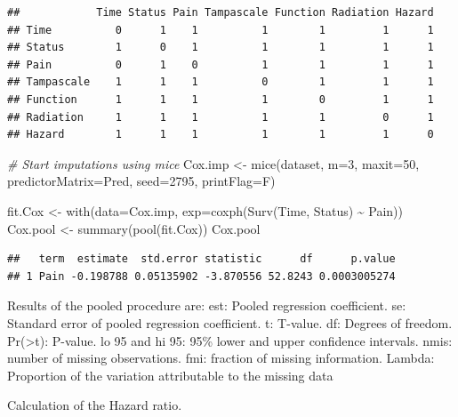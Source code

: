 \documentclass[
]{book}
\newenvironment{Shaded}{\begin{snugshade}}{\end{snugshade}}
\newcommand{\AttributeTok}[1]{\textcolor[rgb]{0.77,0.63,0.00}{#1}}
\newcommand{\CommentTok}[1]{\textcolor[rgb]{0.56,0.35,0.01}{\textit{#1}}}
\newcommand{\DecValTok}[1]{\textcolor[rgb]{0.00,0.00,0.81}{#1}}
\newcommand{\FunctionTok}[1]{\textcolor[rgb]{0.00,0.00,0.00}{#1}}
\newcommand{\NormalTok}[1]{#1}
\newcommand{\OtherTok}[1]{\textcolor[rgb]{0.56,0.35,0.01}{#1}}
\newcommand{\SpecialCharTok}[1]{\textcolor[rgb]{0.00,0.00,0.00}{#1}}
\begin{document}
\begin{verbatim}
##            Time Status Pain Tampascale Function Radiation Hazard
## Time          0      1    1          1        1         1      1
## Status        1      0    1          1        1         1      1
## Pain          0      1    0          1        1         1      1
## Tampascale    1      1    1          0        1         1      1
## Function      1      1    1          1        0         1      1
## Radiation     1      1    1          1        1         0      1
## Hazard        1      1    1          1        1         1      0
\end{verbatim}

\begin{Shaded}
\begin{Highlighting}[]
\CommentTok{\# Start imputations using mice}
\NormalTok{Cox.imp }\OtherTok{\textless{}{-}} \FunctionTok{mice}\NormalTok{(dataset, }\AttributeTok{m=}\DecValTok{3}\NormalTok{, }\AttributeTok{maxit=}\DecValTok{50}\NormalTok{, }\AttributeTok{predictorMatrix=}\NormalTok{Pred, }\AttributeTok{seed=}\DecValTok{2795}\NormalTok{, }\AttributeTok{printFlag=}\NormalTok{F)}

\NormalTok{fit.Cox }\OtherTok{\textless{}{-}} \FunctionTok{with}\NormalTok{(}\AttributeTok{data=}\NormalTok{Cox.imp, }\AttributeTok{exp=}\FunctionTok{coxph}\NormalTok{(}\FunctionTok{Surv}\NormalTok{(Time, Status) }\SpecialCharTok{\textasciitilde{}}\NormalTok{ Pain))}
\NormalTok{Cox.pool }\OtherTok{\textless{}{-}} \FunctionTok{summary}\NormalTok{(}\FunctionTok{pool}\NormalTok{(fit.Cox))}
\NormalTok{Cox.pool}
\end{Highlighting}
\end{Shaded}

\begin{verbatim}
##   term  estimate  std.error statistic      df      p.value
## 1 Pain -0.198788 0.05135902 -3.870556 52.8243 0.0003005274
\end{verbatim}

Results of the pooled procedure are:
est: Pooled regression coefficient.
se: Standard error of pooled regression coefficient.
t: T-value.
df: Degrees of freedom.
Pr(\textgreater\textbar t\textbar): P-value.
lo 95 and hi 95: 95\% lower and upper confidence intervals.
nmis: number of missing observations.
fmi: fraction of missing information.
Lambda: Proportion of the variation attributable to the missing data

Calculation of the Hazard ratio.
\end{document}
